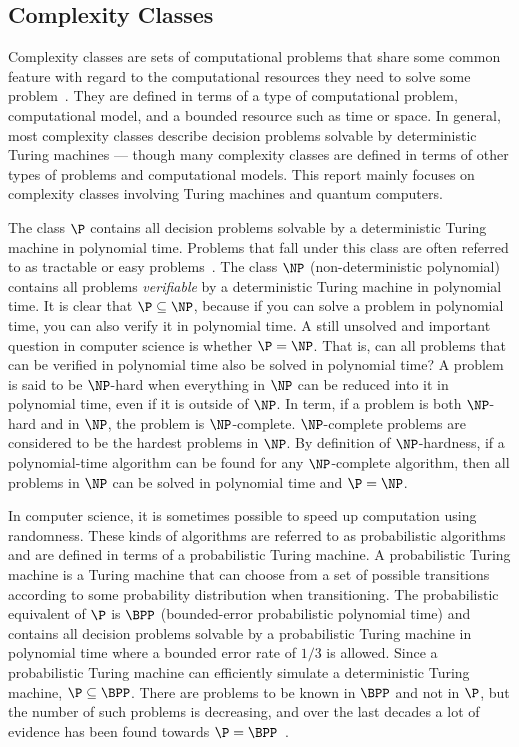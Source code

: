 \subsection{Complexity Classes}
Complexity classes are sets of computational problems that share some common feature with regard to the computational resources they need to solve some problem~\cite{arora2009computational}.
They are defined in terms of a type of computational problem, computational model, and a bounded resource such as time or space.
In general, most complexity classes describe decision problems solvable by deterministic Turing machines --- though many complexity classes are defined in terms of other types of problems and computational models.
This report mainly focuses on complexity classes involving Turing machines and quantum computers.

The class $\P$ contains all decision problems solvable by a deterministic Turing machine in polynomial time.
Problems that fall under this class are often referred to as tractable or easy problems~\cite{cormen2009introduction}.
The class $\NP$ (non-deterministic polynomial) contains all problems \emph{verifiable} by a deterministic Turing machine in polynomial time.
It is clear that $\P \subseteq \NP$, because if you can solve a problem in polynomial time, you can also verify it in polynomial time.
A still unsolved and important question in computer science is whether $\P = \NP$.
That is, can all problems that can be verified in polynomial time also be solved in polynomial time?
A problem is said to be $\NP$-hard when everything in $\NP$ can be reduced into it in polynomial time, even if it is outside of $\NP$.
In term, if a problem is both $\NP$-hard and in $\NP$, the problem is $\NP$-complete.
$\NP$-complete problems are considered to be the hardest problems in $\NP$.
By definition of $\NP$-hardness, if a polynomial-time algorithm can be found for any $\NP$-complete algorithm, then all problems in $\NP$ can be solved in polynomial time and $\P = \NP$.

In computer science, it is sometimes possible to speed up computation using randomness.
These kinds of algorithms are referred to as probabilistic algorithms and are defined in terms of a probabilistic Turing machine.
A probabilistic Turing machine is a Turing machine that can choose from a set of possible transitions according to some probability distribution when transitioning.
The probabilistic equivalent of $\P$ is $\BPP$ (bounded-error probabilistic polynomial time) and contains all decision problems solvable by a probabilistic Turing machine in polynomial time where a bounded error rate of $1/3$ is allowed.
Since a probabilistic Turing machine can efficiently simulate a deterministic Turing machine, $\P \subseteq \BPP$.
There are problems to be known in $\BPP$ and not in $\P$, but the number of such problems is decreasing, and over the last decades a lot of evidence has been found towards $\P = \BPP$~\cite{aaronson2013quantum, goldreich2011world, nisan1994hardness}.

